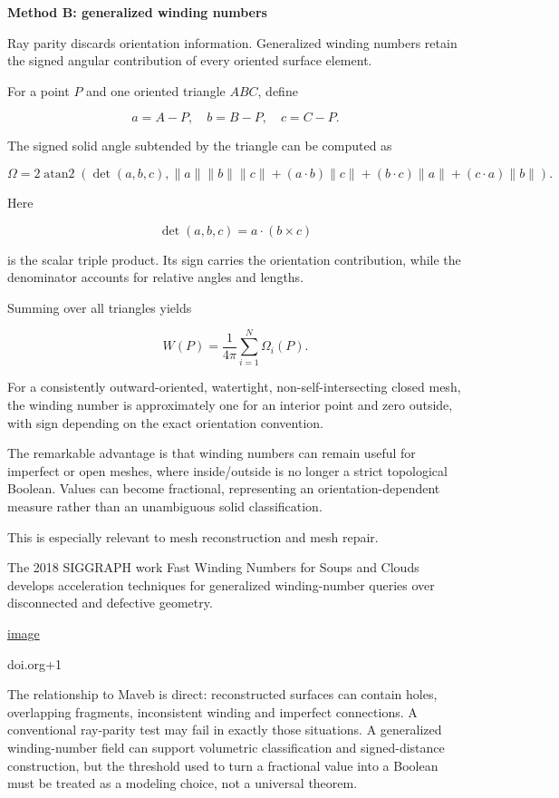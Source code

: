 \textbf{Method B: generalized winding numbers}

Ray parity discards orientation information. Generalized winding numbers retain the signed angular contribution of every oriented surface element.

For a point \(P\) and one oriented triangle \(ABC\), define

\[
a=A-P,\quad b=B-P,\quad c=C-P.
\]

The signed solid angle subtended by the triangle can be computed as

\[
\Omega= 2\operatorname{atan2} \left( \det(a,b,c), \|a\|\|b\|\|c\| +(a\cdot b)\|c\| +(b\cdot c)\|a\| +(c\cdot a)\|b\| \right).
\]

Here

\[
\det(a,b,c)=a\cdot(b\times c)
\]

is the scalar triple product. Its sign carries the orientation contribution, while the denominator accounts for relative angles and lengths.

Summing over all triangles yields

\[
W(P)=\frac{1}{4\pi}\sum_{i=1}^{N}\Omega_i(P).
\]

For a consistently outward-oriented, watertight, non-self-intersecting closed mesh, the winding number is approximately one for an interior point and zero outside, with sign depending on the exact orientation convention.

The remarkable advantage is that winding numbers can remain useful for imperfect or open meshes, where inside/outside is no longer a strict topological Boolean. Values can become fractional, representing an orientation-dependent measure rather than an unambiguous solid classification.

This is especially relevant to mesh reconstruction and mesh repair.

The 2018 SIGGRAPH work Fast Winding Numbers for Soups and Clouds develops acceleration techniques for generalized winding-number queries over disconnected and defective geometry. 

\href{https://www.google.com/s2/favicons?domain=https://doi.org&sz=32}{image}

doi.org+1

The relationship to Maveb is direct: reconstructed surfaces can contain holes, overlapping fragments, inconsistent winding and imperfect connections. A conventional ray-parity test may fail in exactly those situations. A generalized winding-number field can support volumetric classification and signed-distance construction, but the threshold used to turn a fractional value into a Boolean must be treated as a modeling choice, not a universal theorem.

